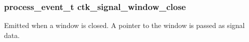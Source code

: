 \subsubsection[{ctk\+\_\+signal\+\_\+window\+\_\+close}]{\setlength{\rightskip}{0pt plus 5cm}process\+\_\+event\+\_\+t ctk\+\_\+signal\+\_\+window\+\_\+close}\label{group__ctkevents_gab92e76646299dbab7216ab1f9dcef9e5}
Emitted when a window is closed. A pointer to the window is passed as signal data. 